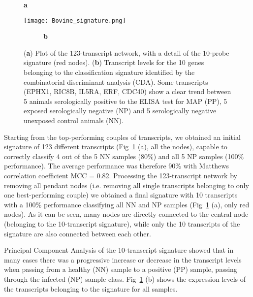 \documentclass{standalone}
\begin{document}
\begin{figure*}[htbp]
\centering
\begin{subfigure}[t]{0.03\textwidth}
  \textbf{a}
\end{subfigure}
\begin{subfigure}[t]{0.95\textwidth}
  \texttt{[image: Bovine\_signature.png]}
\end{subfigure}
\end{figure*}
\begin{figure}[htbp]
\centering
\begin{subfigure}[t]{0.03\textwidth}
  \textbf{b}
\end{subfigure}
  \def\svgwidth{\linewidth}
  
\begin{subfigure}[t]{0.95\textwidth}
\end{subfigure}
\caption[Caption Bovine]{(\textbf{a}) Plot of the 123-transcript network, with a detail of the 10-probe signature (red nodes)\footnotemark.
(\textbf{b}) Transcript levels for the 10 genes belonging to the classification signature identified by the combinatorial discriminant analysis (CDA).
Some transcripts (EPHX1, RIC8B, IL5RA, ERF, CDC40) show a clear trend  between 5 animals serologically positive to the ELISA test for MAP (PP), 5 exposed serologically negative (NP) and 5 serologically negative unexposed control animals (NN).
}
\label{fig:bovine_signature}
\end{figure}


Starting from the top-performing couples of transcripts, we obtained an initial signature of 123 different transcripts (Fig~\ref{fig:bovine_signature} (a), all the nodes), capable to correctly classify 4 out of the 5 NN samples (80\%) and all 5 NP samples (100\% performance).
The average performance was therefore 90\% with Matthews correlation coefficient MCC = 0.82.
Processing the 123-transcript network by removing all pendant nodes (i.e. removing all single transcripts belonging to only one best-performing couple) we obtained a final signature with 10 transcripts with a 100\% performance classifying all NN and NP samples (Fig~\ref{fig:bovine_signature} (a), only red nodes).
As it can be seen, many nodes are directly connected to the central node (belonging to the 10-transcript signature), while only the 10 transcripts of the signature are also connected between each other.

Principal Component Analysis of the 10-transcript signature showed that in many cases there was a progressive increase or decrease in the transcript levels when passing from a healthy (NN) sample to a positive (PP) sample, passing through the infected (NP) sample class.
Fig~\ref{fig:bovine_signature} (b) shows the expression levels of the transcripts belonging to the signature for all samples.
\end{document}
